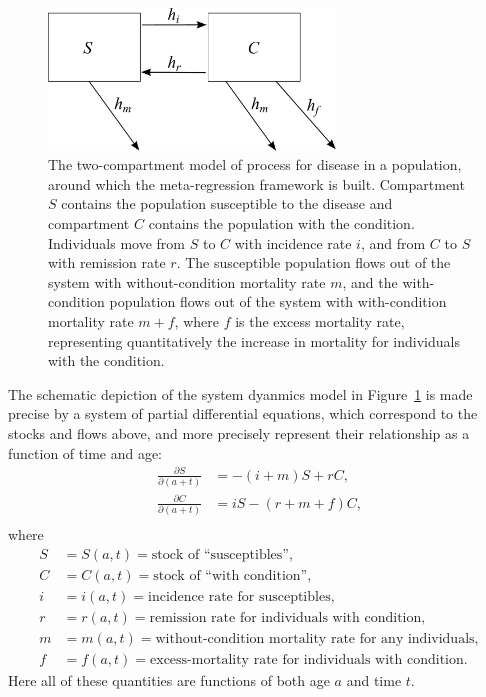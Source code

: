 \documentclass[12pt]{article}
\newcommand{\1}{\mathbf{1}}
\newcommand{\0}{\mathbf{0}}
\begin{document}
\begin{figure}[h]
\begin{center}
\includegraphics[width=3in]{SC.pdf}
\caption{The two-compartment model of process for disease in a
  population, around which the meta-regression framework is
  built. Compartment $S$ contains the population susceptible to the
  disease and compartment $C$ contains the population with the
  condition. Individuals move from $S$ to $C$ with incidence rate $i$,
  and from $C$ to $S$ with remission rate $r$. The susceptible
  population flows out of the system with without-condition mortality
  rate $m$, and the with-condition population flows out of the system
  with with-condition mortality rate $m+f$, where $f$ is the excess
  mortality rate, representing quantitatively the increase in
  mortality for individuals with the condition.}
\label{forward-sim-two-compartment}
\end{center}
\end{figure}

The schematic depiction of the system dyanmics model in
Figure~\ref{forward-sim-two-compartment} is made precise by a system
of partial differential equations, which correspond to the stocks and
flows above, and more precisely represent their relationship as a
function of time and age:
\begin{align*}
\frac{\partial S}{\partial (a+t)} &= -(i + m)S + rC,\\
\frac{\partial C}{\partial (a+t)} &= iS - (r + m + f)C,\\
\end{align*}
where
\begin{align*}
S &= S(a,t) = \text{stock of ``susceptibles''},\\
C &= C(a,t) = \text{stock of ``with condition''},\\[.1in]
i &= i(a,t) = \text{incidence rate for susceptibles},\\
r &= r(a,t) = \text{remission rate for individuals with condition},\\
m &= m(a,t) = \text{without-condition mortality rate for any individuals},\\
f &= f(a,t) = \text{excess-mortality rate for individuals with
condition}.
\end{align*}
Here all of these quantities are functions of both age $a$ and time
$t$.
\end{document}
